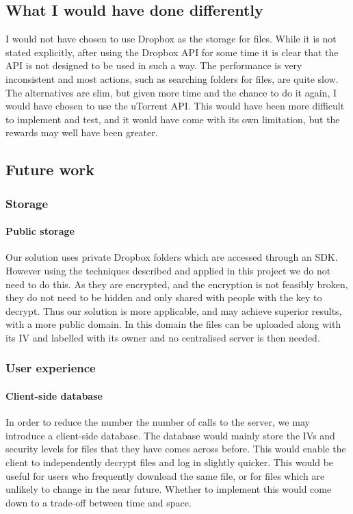 \documentclass[12pt, titlepage]{article}
\begin{document}
\subsection{What I would have done differently}
I would not have chosen to use Dropbox as the storage for files. While it is not stated explicitly, after using the Dropbox API for some time it is clear that the API is not designed to be used in such a way. The performance is very inconsistent and most actions, such as searching folders for files, are quite slow.
\newline \indent The alternatives are slim, but given more time and the chance to do it again, I would have chosen to use the uTorrent API. This would have been more difficult to implement and test, and it would have come with its own limitation, but the rewards may well have been greater.

\subsection{Future work}
\subsubsection*{Storage}
\paragraph*{Public storage} Our solution uses private Dropbox folders which are accessed through an SDK. However using the techniques described and applied in this project we do not need to do this. As they are encrypted, and the encryption is not feasibly broken, they do not need to be hidden and only shared with people with the key to decrypt. Thus our solution is more applicable, and may achieve superior results, with a more public domain. In this domain the files can be uploaded along with its IV and labelled with its owner and no centralised server is then needed.
\subsubsection*{User experience}
\paragraph*{Client-side database} In order to reduce the number the number of calls to the server, we may introduce a client-side database. The database would mainly store the IVs and security levels for files that they have comes across before. This would enable the client to independently decrypt files and log in slightly quicker. This would be useful for users who frequently download the same file, or for files which are unlikely to change in the near future. Whether to implement this would come down to a trade-off between time and space.
\end{document}
